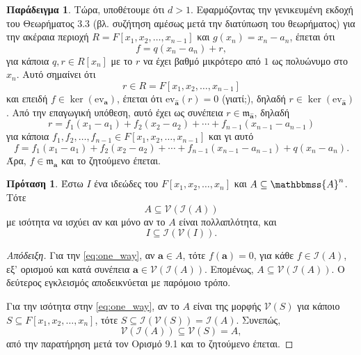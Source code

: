 \documentclass[12pt,a4paper,reqno]{amsart}
\theoremstyle{definition}
\newtheorem{proposition}[theorem]{Πρόταση}
\newtheorem{example}[theorem]{Παράδειγμα}
\theoremstyle{remark}
\numberwithin{theorem}{section}
\numberwithin{exercise}{section}
\numberwithin{equation}{section}
\renewcommand{\AA}{\mathbbmss{A}}
\newcommand{\fm}{\mathfrak{m}}
\newcommand{\iI}{\mathcal{I}}
\newcommand{\vV}{\mathcal{V}}
\newcommand{\bfa}{\pmb{a}}
\newcommand{\ev}{\mathrm{ev}}
\newcommand{\Pol}[1]{F[x_1, x_2, \dots, x_{#1}]}
\begin{document}
\begin{example}
    Τώρα, υποθέτουμε ότι $d > 1$. Εφαρμόζοντας την γενικευμένη εκδοχή του Θεωρήματος 3.3 (βλ. συζήτηση αμέσως μετά την διατύπωση του θεωρήματος) για την ακέραια περιοχή $R = \Pol{n-1}$ και $g(x_n) = x_n-a_n$, έπεται ότι 
    \[
    f = q(x_n-a_n) + r,
    \]
    για κάποια $q, r \in R[x_n]$ με το $r$ να έχει βαθμό μικρότερο από $1$ ως πολυώνυμο στο $x_n$. Αυτό σημαίνει ότι
    \[  
    r \in R = \Pol{n-1}
    \] 
    και επειδή $f \in \ker(\ev_{\bfa})$, έπεται ότι $\ev_{\hat{\bfa}}(r) = 0$ (γιατί;), δηλαδή $r \in \ker(\ev_{\hat{\bfa}})$. Από την επαγωγική υπόθεση, αυτό έχει ως συνέπεια $r \in \fm_{\hat{\bfa}}$, δηλαδή 
    \[
    r = f_1(x_1-a_1) + f_2(x_2-a_2) + \cdots + f_{n-1}(x_{n-1}-a_{n-1})
    \] 
    για κάποια $f_1, f_2, \dots, f_{n-1} \in \Pol{n-1}$ και γι αυτό 
    \[
    f = f_1(x_1-a_1) + f_2(x_2-a_2) + \cdots + f_{n-1}(x_{n-1}-a_{n-1}) + q(x_n-a_n).
    \]
    Άρα, $f \in \fm_{\bfa}$ και το ζητούμενο έπεται.
\end{example}

\begin{proposition}
    \label{prop:vanishing_ideal}
    Έστω $I$ ένα ιδεώδες του $\Pol{n}$ και $A \subseteq \AA^n$. Τότε 
    \begin{equation} 
        \label{eq:one_way}
        A \subseteq \vV\left(
        \iI(A)
        \right)
    \end{equation}
    με ισότητα να ισχύει αν και μόνο αν το $A$ είναι πολλαπλότητα, και 
    \begin{equation} 
        \label{eq:other_way}
        I \subseteq \iI(\vV(I)).
    \end{equation}
\end{proposition}

\begin{proof}[Απόδειξη]
    Για την \eqref{eq:one_way}, αν $\bfa \in A$, τότε $f(\bfa) = 0$, για κάθε $f \in \iI(A)$, εξ' ορισμού και κατά συνέπεια $\bfa \in \vV\left(
        \iI(A)
    \right)$. Επομένως, $A \subseteq \vV\left(
        \iI(A)
    \right)$. Ο δεύτερος εγκλεισμός αποδεικνύεται με παρόμοιο τρόπο.

    Για την ισότητα στην \eqref{eq:one_way}, αν το $A$ είναι της μορφής $\vV(S)$ για κάποιο $S \subseteq \Pol{n}$, τότε $S \subseteq \iI(\vV(S)) = \iI(A)$. Συνεπώς, 
    \[
    \vV\left(
        \iI(A)
    \right) \subseteq \vV(S) = A,
    \]
    από την παρατήρηση μετά τον Ορισμό 9.1 και το ζητούμενο έπεται.
\end{proof}
\end{document}
